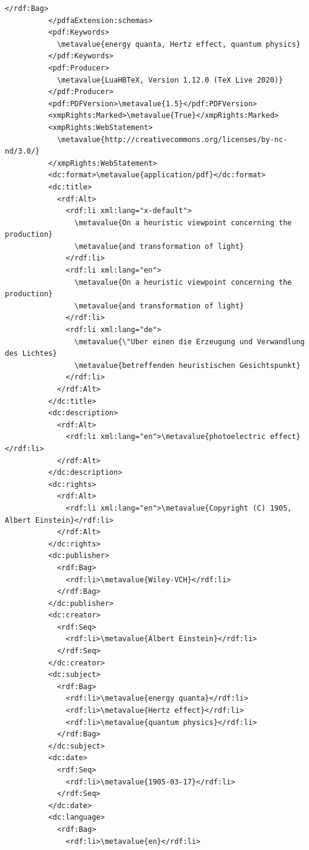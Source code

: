 \begin{Verbatim}[fontsize=\small,commandchars=\\\{\}]
            </rdf:Bag>
          </pdfaExtension:schemas>
          <pdf:Keywords>
            \metavalue{energy quanta, Hertz effect, quantum physics}
          </pdf:Keywords>
          <pdf:Producer>
            \metavalue{LuaHBTeX, Version 1.12.0 (TeX Live 2020)}
          </pdf:Producer>
          <pdf:PDFVersion>\metavalue{1.5}</pdf:PDFVersion>
          <xmpRights:Marked>\metavalue{True}</xmpRights:Marked>
          <xmpRights:WebStatement>
            \metavalue{http://creativecommons.org/licenses/by-nc-nd/3.0/}
          </xmpRights:WebStatement>
          <dc:format>\metavalue{application/pdf}</dc:format>
          <dc:title>
            <rdf:Alt>
              <rdf:li xml:lang="x-default">
                \metavalue{On a heuristic viewpoint concerning the production}
                \metavalue{and transformation of light}
              </rdf:li>
              <rdf:li xml:lang="en">
                \metavalue{On a heuristic viewpoint concerning the production}
                \metavalue{and transformation of light}
              </rdf:li>
              <rdf:li xml:lang="de">
                \metavalue{\"Uber einen die Erzeugung und Verwandlung des Lichtes}
                \metavalue{betreffenden heuristischen Gesichtspunkt}
              </rdf:li>
            </rdf:Alt>
          </dc:title>
          <dc:description>
            <rdf:Alt>
              <rdf:li xml:lang="en">\metavalue{photoelectric effect}</rdf:li>
            </rdf:Alt>
          </dc:description>
          <dc:rights>
            <rdf:Alt>
              <rdf:li xml:lang="en">\metavalue{Copyright (C) 1905, Albert Einstein}</rdf:li>
            </rdf:Alt>
          </dc:rights>
          <dc:publisher>
            <rdf:Bag>
              <rdf:li>\metavalue{Wiley-VCH}</rdf:li>
            </rdf:Bag>
          </dc:publisher>
          <dc:creator>
            <rdf:Seq>
              <rdf:li>\metavalue{Albert Einstein}</rdf:li>
            </rdf:Seq>
          </dc:creator>
          <dc:subject>
            <rdf:Bag>
              <rdf:li>\metavalue{energy quanta}</rdf:li>
              <rdf:li>\metavalue{Hertz effect}</rdf:li>
              <rdf:li>\metavalue{quantum physics}</rdf:li>
            </rdf:Bag>
          </dc:subject>
          <dc:date>
            <rdf:Seq>
              <rdf:li>\metavalue{1905-03-17}</rdf:li>
            </rdf:Seq>
          </dc:date>
          <dc:language>
            <rdf:Bag>
              <rdf:li>\metavalue{en}</rdf:li>

\end{Verbatim}

